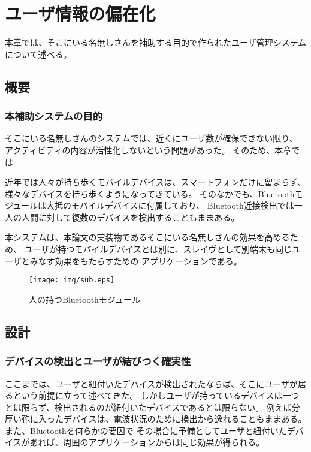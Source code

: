 \chapter{ユーザ情報の偏在化}\label{chap:implementation_2}

本章では、そこにいる名無しさんを補助する目的で作られたユーザ管理システムについて述べる。

\newpage

\section{概要}

\subsection{本補助システムの目的}

そこにいる名無しさんのシステムでは、近くにユーザ数が確保できない限り、
アクティビティの内容が活性化しないという問題があった。
そのため、本章では

近年では人々が持ち歩くモバイルデバイスは、スマートフォンだけに留まらず、様々なデバイスを持ち歩くようになってきている。
そのなかでも、Bluetoothモジュールは大抵のモバイルデバイスに付属しており、
Bluetooth近接検出では一人の人間に対して復数のデバイスを検出することもままある。

本システムは、本論文の実装物であるそこにいる名無しさんの効果を高めるため、
ユーザが持つモバイルデバイスとは別に、スレイヴとして別端末も同じユーザとみなす効果をもたらすための
アプリケーションである。

\begin{figure}[b]
  \begin{center}
    \texttt{[image: img/sub.eps]}
  \end{center}
  \caption{人の持つBluetoothモジュール}
  \label{fig:sub}
\end{figure}

\newpage

\section{設計}

\subsection{デバイスの検出とユーザが結びつく確実性}

ここまでは、ユーザと紐付いたデバイスが検出されたならば、そこにユーザが居るという前提に立って述べてきた。
しかしユーザが持っているデバイスは一つとは限らず、検出されるのが紐付いたデバイスであるとは限らない。
例えば分厚い鞄に入ったデバイスは、電波状況のために検出から逸れることもままある。
また、Bluetoothを何らかの要因で
その場合に予備としてユーザと紐付いたデバイスがあれば、周囲のアプリケーションからは同じ効果が得られる。


